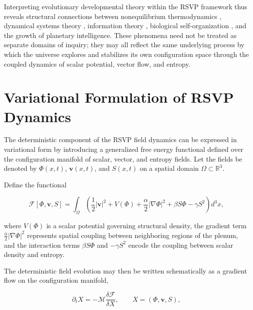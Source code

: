 \documentclass[12pt]{article}
\begin{document}
Interpreting evolutionary developmental theory within the RSVP framework thus reveals structural connections between nonequilibrium thermodynamics \cite{prigogine1984,nicolis1977}, dynamical systems theory \cite{strogatz1994}, information theory \cite{cover2006,jaynes1957,amari2016}, biological self-organization \cite{kauffman1993,maturana1980,smithmorowitz2016}, and the growth of planetary intelligence. These phenomena need not be treated as separate domains of inquiry; they may all reflect the same underlying process by which the universe explores and stabilizes its own configuration space through the coupled dynamics of scalar potential, vector flow, and entropy.

\newpage
\appendix
\renewcommand{\thesection}{\Alph{section}}


\section{Variational Formulation of RSVP Dynamics}
\label{app:variational}

The deterministic component of the RSVP field dynamics can be expressed in variational form by introducing a generalized free energy functional defined over the configuration manifold of scalar, vector, and entropy fields. Let the fields be denoted by $\Phi(x,t)$, $\mathbf{v}(x,t)$, and $S(x,t)$ on a spatial domain $\Omega \subset \mathbb{R}^3$.

Define the functional

\begin{equation}
\mathcal{F}[\Phi,\mathbf{v},S] =
\int_{\Omega}
\left(
\frac{1}{2}|\mathbf{v}|^2
+
V(\Phi)
+
\frac{\alpha}{2}|\nabla \Phi|^2
+
\beta S\Phi
-
\gamma S^2
\right)
d^3x ,
\label{eq:rsvp_free_energy}
\end{equation}

where $V(\Phi)$ is a scalar potential governing structural density, the gradient term $\frac{\alpha}{2}|\nabla \Phi|^2$ represents spatial coupling between neighboring regions of the plenum, and the interaction terms $\beta S\Phi$ and $-\gamma S^2$ encode the coupling between scalar density and entropy.

The deterministic field evolution may then be written schematically as a gradient flow on the configuration manifold,

\begin{equation}
\partial_t X
=
-
\mathcal{M}
\frac{\delta \mathcal{F}}{\delta X},
\qquad
X = (\Phi,\mathbf{v},S),
\label{eq:gradient_flow}
\end{equation}
\end{document}
